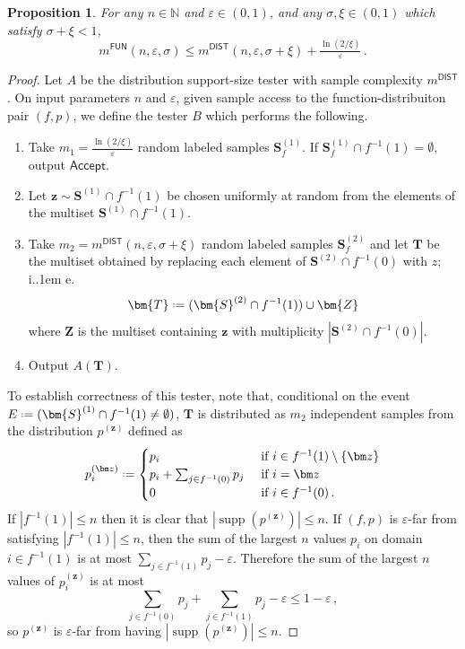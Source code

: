 \documentclass[10pt,a4paper]{article}
\newtheorem{proposition}{Proposition}[section]
\newcommand*\ie{i.\kern.1em e.\ }
\DeclareMathOperator{\supp}{supp}   %
\newcommand*{\define}{\mathrel{\vcenter{\baselineskip0.5ex \lineskiplimit0pt
                      \hbox{\scriptsize.}\hbox{\scriptsize.}}}%
                      =}
\newcommand{\bN}{\ensuremath{\mathbb{N}}}
\newcommand{\ACCEPT}{\mathsf{Accept}}
\newcommand{\successprob}{\sigma}
\newcommand{\DIST}{\mathsf{DIST}}
\newcommand{\FUN}{\mathsf{FUN}}
\renewcommand{\epsilon}{\varepsilon}
\begin{document}
\begin{proposition}
\label{res:fun-to-dist}
For any $n \in \bN$ and $\epsilon \in (0,1)$, and any $\successprob, \xi \in (0,1)$ which satisfy
$\successprob + \xi < 1$,
\[
  m^\FUN(n,\epsilon, \successprob) \leq m^\DIST(n,\epsilon, \successprob + \xi) +
  \tfrac{\ln(2/\xi)}{\epsilon} \,.
\]
\end{proposition}
\begin{proof}
Let $A$ be the distribution support-size tester with sample complexity $m^\DIST$.
On input parameters $n$ and $\epsilon$, given sample access to the function-distribuiton pair
$(f,p)$, we define the tester $B$ which performs the following.
\begin{enumerate}
\item Take $m_1 = \tfrac{\ln(2/\xi)}{\epsilon}$ random labeled samples
$\bm{S}^{(1)}_f$. If $\bm{S}^{(1)}_f \cap f^{-1}(1) = \emptyset$, output $\ACCEPT$.
\item Let $\bm{z} \sim \bm{S}^{(1)} \cap f^{-1}(1)$ be chosen uniformly at random from the elements of the multiset
$\bm{S}^{(1)} \cap f^{-1}(1)$.
\item Take $m_2 = m^\DIST(n,\epsilon,\successprob + \xi)$ random labeled samples $\bm{S}^{(2)}_f$
and let $\bm{T}$ be the multiset obtained by replacing each element of $\bm{S}^{(2)} \cap f^{-1}(0)$
with $z$; \ie
\[
\bm{T} \define ( \bm{S}^{(2)} \cap f^{-1}(1) ) \cup \bm{Z}
\]
where  $\bm{Z}$ is the multiset containing $\bm{z}$ with multiplicity $|\bm{S}^{(2)} \cap
f^{-1}(0)|$.
\item Output $A(\bm{T})$.
\end{enumerate}
To establish correctness of this tester, note that, conditional on the event $E \define (\bm{S}^{(1)} \cap
f^{-1}(1) \neq \emptyset)$, $\bm{T}$ is distributed as $m_2$ independent samples from the
distribution $p^{(\bm z)}$ defined as
\[
  p^{(\bm z)}_i \define \begin{cases}
    p_i &\text{ if } i \in f^{-1}(1) \setminus \{\bm z\} \\
    p_i + \sum_{j \in f^{-1}(0)} p_j &\text{ if } i = \bm z \\
    0 &\text{ if } i \in f^{-1}(0) \,.
  \end{cases}
\]
If $|f^{-1}(1)| \leq n$ then it is clear that $|\supp(p^{(\bm z)})| \leq n$. If $(f,p)$ is
$\epsilon$-far from satisfying $|f^{-1}(1)| \leq n$, then the sum of the largest $n$ values $p_i$ on
domain $i \in f^{-1}(1)$ is at most $\sum_{j \in f^{-1}(1)} p_j -\epsilon$.  Therefore the sum of
the largest $n$ values of $p^{(\bm z)}_i$ is at most
\[
  \sum_{j \in f^{-1}(0)} p_j + \sum_{j \in f^{-1}(1)} p_j - \epsilon \leq 1 -\epsilon \,,
\]
so $p^{(\bm z)}$ is $\epsilon$-far from having $|\supp(p^{(\bm z)})| \leq n$.


\end{proof}
\end{document}
